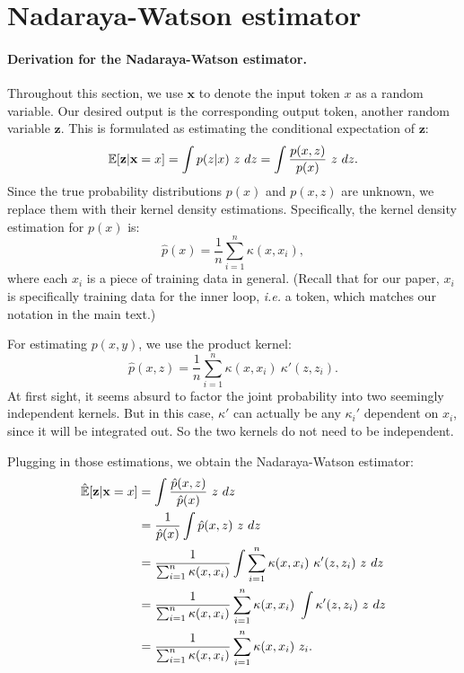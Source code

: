 \documentclass{article}
\begin{document}
\section{Nadaraya-Watson estimator}
\label{app:theory}

\paragraph{Derivation for the Nadaraya-Watson estimator.}
Throughout this section, we use $\mathbf{x}$ to denote the input token $x$ as a random variable.
Our desired output is the corresponding output token, another random variable $\mathbf{z}$.
This is formulated as estimating the conditional expectation of $\mathbf{z}$:
$$
\mathbb{E}[\mathbf{z}|\mathbf{x} = x] = \int p(z|x)~z~dz = \int \frac{p(x, z)}{p(x)}~z~dz.
$$
Since the true probability distributions $p(x)$ and $p(x, z)$ are unknown, we replace them with their kernel density estimations.
Specifically, the kernel density estimation for $p(x)$ is:
$$
\hat{p}(x) = \frac{1}{n}\sum_{i=1}^n \kappa(x, x_i),
$$
where each $x_i$ is a piece of training data in general.
(Recall that for our paper, $x_i$ is specifically training data for the inner loop, \textit{i.e.} a token, which matches our notation in the main text.)

For estimating $p(x,y)$, we use the product kernel:
$$
\hat{p}(x, z) = \frac{1}{n}\sum_{i=1}^n \kappa(x, x_i)~\kappa'(z, z_i).
$$
At first sight, it seems absurd to factor the joint probability into two seemingly independent kernels.
But in this case, $\kappa'$ can actually be any $\kappa_i'$ dependent on $x_i$, since it will be integrated out. So the two kernels do not need to be independent.

Plugging in those estimations, we obtain the Nadaraya-Watson estimator:
\begin{align*}
\hat{\mathbb{E}}[\mathbf{z}|\mathbf{x} = x] &= \int \frac{\hat{p}(x, z)}{\hat{p}(x)}~z~dz \\
&= \frac{1}{\hat{p}(x)} \int \hat{p}(x, z)~z~dz \\
&= \frac{1}{\sum_{i=1}^n \kappa(x, x_i)} \int \sum_{i=1}^n \kappa(x, x_i)~\kappa'(z, z_i)~z~dz \\
&= \frac{1}{\sum_{i=1}^n \kappa(x, x_i)} \sum_{i=1}^n \kappa(x, x_i)~\int \kappa'(z, z_i)~z~dz \\
&= \frac{1}{\sum_{i=1}^n \kappa(x, x_i)} \sum_{i=1}^n \kappa(x, x_i) ~z_i.
\end{align*}
\end{document}
